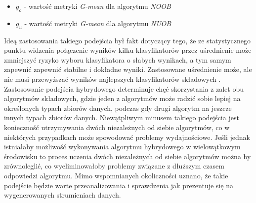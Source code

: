 \begin{itemize}
    \item $g_o$ - wartość metryki \textit{G-mean} dla algorytmu \textit{NOOB}
    \item $g_u$ - wartość metryki \textit{G-mean} dla algorytmu \textit{NUOB}
\end{itemize}

\noindent Ideą zastosowania takiego podejścia był fakt dotyczący tego, że ze statystycznego punktu widzenia połączenie wyników kilku klasyfikatorów przez uśrednienie może zmniejszyć ryzyko wyboru klasyfikatora o słabych wynikach, a tym samym zapewnić zapewnić stabilne i dokładne wyniki. Zastosowane uśrednienie może, ale nie musi przewyższać wyników najlepszych klasyfikatorów składowych \cite{Article:Hybrid}\cite{Article:OBSecond}. Zastosowanie podejścia hybrydowego determinuje chęć skorzystania z zalet obu algorytmów składowych, gdzie jeden z algorytmów może radzić sobie lepiej na określonych typach zbiorów danych, podczas gdy drugi algorytm na jeszcze innych typach zbiorów danych. Niewątpliwym minusem takiego podejścia jest konieczność utrzymywania dwóch niezależnych od siebie algorytmów, co w niektórych przypadkach może spowodować problemy wydajnościowe. Jeśli jednak istniałaby możliwość wykonywania algorytmu hybrydowego w wielowątkowym środowisku to proces uczenia dwóch niezależnych od siebie algorytmów można by zrównoleglić, co wyeliminowałoby problemy związane z dłuższym czasem odpowiedzi algorytmu. Mimo wspomnianych okoliczności uznano, że takie podejście będzie warte przeanalizowania i sprawdzenia jak prezentuje się na wygenerowanych strumieniach danych.